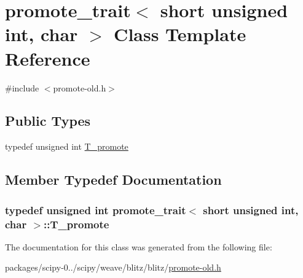 \hypertarget{classpromote__trait_3_01short_01unsigned_01int_00_01char_01_4}{}\section{promote\+\_\+trait$<$ short unsigned int, char $>$ Class Template Reference}
\label{classpromote__trait_3_01short_01unsigned_01int_00_01char_01_4}


{\ttfamily \#include $<$promote-\/old.\+h$>$}

\subsection*{Public Types}
\begin{DoxyCompactItemize}
\item 
typedef unsigned int \hyperlink{classpromote__trait_3_01short_01unsigned_01int_00_01char_01_4_a744ee1dd23779efada3ce0ad0da22e52}{T\+\_\+promote}
\end{DoxyCompactItemize}


\subsection{Member Typedef Documentation}
\hypertarget{classpromote__trait_3_01short_01unsigned_01int_00_01char_01_4_a744ee1dd23779efada3ce0ad0da22e52}{}
\subsubsection[{T\+\_\+promote}]{\setlength{\rightskip}{0pt plus 5cm}typedef unsigned int {\bf promote\+\_\+trait}$<$ short unsigned int, char $>$\+::{\bf T\+\_\+promote}}\label{classpromote__trait_3_01short_01unsigned_01int_00_01char_01_4_a744ee1dd23779efada3ce0ad0da22e52}


The documentation for this class was generated from the following file\+:\begin{DoxyCompactItemize}
\item 
packages/scipy-\/0../scipy/weave/blitz/blitz/\hyperlink{promote-old_8h}{promote-\/old.\+h}\end{DoxyCompactItemize}
